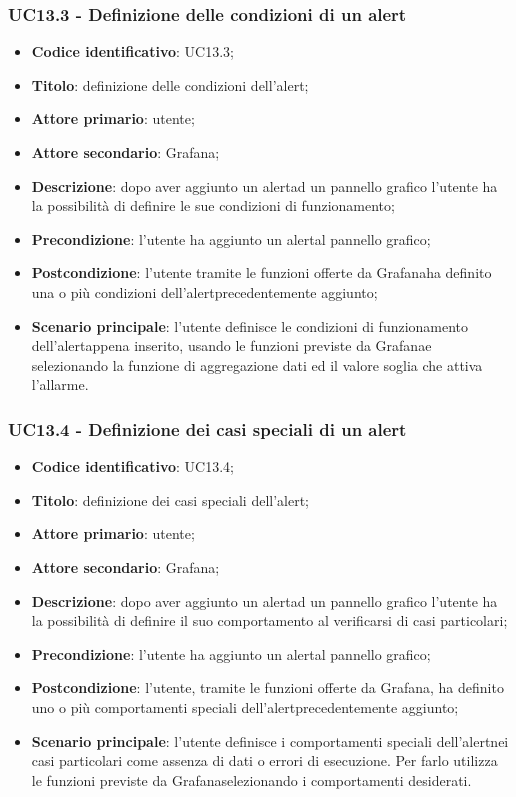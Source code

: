 \subsubsection{UC13.3 - Definizione delle condizioni di un alert}
\begin{itemize}
	\item \textbf{Codice identificativo}: UC13.3;
	\item \textbf{Titolo}: definizione delle condizioni dell'alert\glo;
	\item \textbf{Attore primario}: utente;
	\item \textbf{Attore secondario}: Grafana\glo;
	\item \textbf{Descrizione}: dopo aver aggiunto un alert\glosp ad un pannello grafico l'utente ha la possibilità di definire le sue condizioni di funzionamento;
	\item \textbf{Precondizione}: l'utente ha aggiunto un alert\glosp al pannello grafico;
	\item \textbf{Postcondizione}: l'utente tramite le funzioni offerte da Grafana\glosp ha definito una o più condizioni dell'alert\glosp precedentemente aggiunto;
	\item \textbf{Scenario principale}: l'utente definisce le condizioni di funzionamento dell'alert\glosp appena inserito, usando le funzioni previste da Grafana\glosp e selezionando la funzione di aggregazione dati ed il valore soglia che attiva l'allarme.
\end{itemize}

\subsubsection{UC13.4 - Definizione dei casi speciali di un alert}
	\begin{itemize}
	\item \textbf{Codice identificativo}: UC13.4;
	\item \textbf{Titolo}: definizione dei casi speciali dell'alert\glo;
	\item \textbf{Attore primario}: utente;
	\item \textbf{Attore secondario}: Grafana\glo;
	\item \textbf{Descrizione}: dopo aver aggiunto un alert\glosp ad un pannello grafico l'utente ha la possibilità di definire il suo comportamento al verificarsi di casi particolari;
	\item \textbf{Precondizione}: l'utente ha aggiunto un alert\glosp al pannello grafico;
	\item \textbf{Postcondizione}: l'utente, tramite le funzioni offerte da Grafana\glosp, ha definito uno o più comportamenti speciali dell'alert\glosp precedentemente aggiunto;
	\item \textbf{Scenario principale}: l'utente definisce i comportamenti speciali dell'alert\glosp nei casi particolari come assenza di dati o errori di esecuzione. Per farlo utilizza le funzioni previste da Grafana\glosp selezionando i comportamenti desiderati.
\end{itemize} 